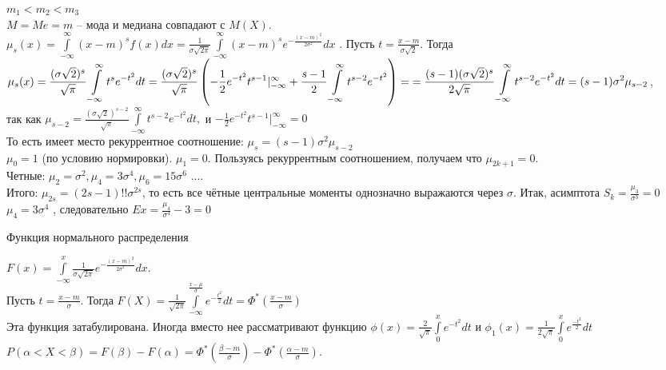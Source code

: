 \documentclass[russian, 12pt, fleqn]{article}
\begin{document}
$m_1<m_2<m_3$\\
$M=Me=m $ -- мода и медиана совпадают с $M(X)$.\\
$\mu_s(x) = \int\limits_{-\infty}^{\infty} (x-m)^s f(x)dx = \frac{1}{\sigma\sqrt{2\pi}} \int\limits_{-\infty}^{\infty} (x-m)^s e^{-\frac{(x-m)^2}{2\sigma^2}}dx$ . Пусть $t = \frac{x - m}{\sigma\sqrt{2}}$.
Тогда $\displaystyle{ \mu_s(x) = \frac{(\sigma \sqrt{2})^s}{\sqrt{\pi}}  \int\limits_{-\infty}^{\infty} t^s e^{-t^2} dt = \frac{(\sigma \sqrt{2})^s}{\sqrt{\pi}}\left (-\frac{1}{2}e^{-t^2}t^{s-1}|_{-\infty}^{\infty}+ \frac{s-1}{2}\int\limits_{-\infty}^{\infty}t^{s-2}e^{-t^2}\right )  } =\\ \displaystyle{ =\frac{(s-1)(\sigma\sqrt{2})^s}{2\sqrt{\pi}} \int\limits_{-\infty}^{\infty} t^{s-2}e^{-t^2}dt =(s-1)\sigma^2\mu_{s-2}}$,\\ так как $\mu_{s-2}  = \frac{(\sigma\sqrt{2})^{s-2}}{\sqrt{\pi}} \int\limits_{-\infty}^{\infty}t ^{s-2} e^{-t^2}dt,$ и $-\frac{1}{2}e^{-t^2}t^{s-1}|_{-\infty}^{\infty} = 0$\\
То есть имеет место рекуррентное соотношение: $\mu_s = (s-1)\sigma^2\mu_{s-2}$\\
$\mu_0 = 1$ (по условию нормировки). $\mu_1 = 0$. Пользуясь рекуррентным соотношением, получаем что $\mu_{2k+1} = 0$.\\
Четные: $\mu_2 = \sigma^2, \mu_4 = 3\sigma^4, \mu_6 = 15\sigma^6$ ....\\
Итого: $\mu_{2s} = (2s-1)!!\sigma^{2s}$, то есть все чётные центральные моменты однозначно выражаются через $\sigma$. Итак, асимптота $S_k = \frac{\mu_3}{\sigma^3} = 0$\\
$\mu_4 = 3\sigma^4$ , следовательно $Ex = \frac{\mu_4}{\sigma^4} - 3 = 0$
\begin{center}
$\textbf{Функция нормального распределения }$\\
\end{center}
$F(x) = \int \limits_{-\infty}^{x}\frac{1}{\sigma\sqrt{2\pi}} e^{-\frac{(x-m)^2}{2\sigma^2}}dx$.\\
Пусть $t = \frac{x-m}{\sigma}$.
Тогда $F(X) = \frac{1}{\sqrt{2\pi}}\int\limits_{-\infty}^{\frac{x-\mu}{\sigma}} e^{-\frac{t^2}{2}} dt =  \Phi^*(\frac{x-m}{\sigma})$\\
Эта функция затабулирована. Иногда вместо нее рассматривают функцию $\phi(x) = \frac{2}{\sqrt{\pi}} \int\limits_{0}^{x}e^{-t^2}dt$ и $\phi_1(x) = \frac{1}{2\sqrt{\pi}} \int\limits_{0}^{x} e^{\frac{-t^2}{2}}dt$\\
$P(\alpha < X < \beta) = F(\beta) - F(\alpha) = \Phi^*(\frac{\beta - m}{\sigma}) - \Phi^*(\frac{\alpha - m}{\sigma}).$\\
\end{document}
